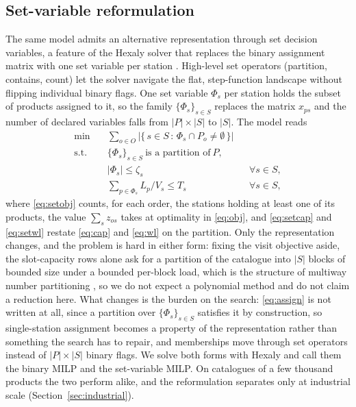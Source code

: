 \documentclass[]{interact}
\begin{document}
\subsection{Set-variable reformulation}\label{sec:setvar}
The same model admits an alternative representation through set decision variables, a feature of the Hexaly solver that replaces the binary assignment matrix with one set variable per station \citep{blaisemodeling}. High-level set operators (partition, contains, count) let the solver navigate the flat, step-function landscape without flipping individual binary flags. One set variable $\Phi_s$ per station holds the subset of products assigned to it, so the family $\{\Phi_s\}_{s \in S}$ replaces the matrix $x_{ps}$ and the number of declared variables falls from $|P|\times|S|$ to $|S|$. The model reads
\begin{align}
\min \quad & \sum_{o \in O} \bigl|\{\, s \in S \,:\, \Phi_s \cap P_o \neq \emptyset \,\}\bigr| \label{eq:setobj}\\
\text{s.t.} \quad & \{\Phi_s\}_{s \in S}\ \text{is a partition of}\ P, \label{eq:setpart}\\
& |\Phi_s| \le \zeta_s && \forall s \in S, \label{eq:setcap}\\
& \sum_{p \in \Phi_s} L_p / V_s \le T_s && \forall s \in S, \label{eq:setwl}
\end{align}
where \eqref{eq:setobj} counts, for each order, the stations holding at least one of its products, the value $\sum_{s} z_{os}$ takes at optimality in \eqref{eq:obj}, and \eqref{eq:setcap} and \eqref{eq:setwl} restate \eqref{eq:cap} and \eqref{eq:wl} on the partition. Only the representation changes, and the problem is hard in either form: fixing the visit objective aside, the slot-capacity rows alone ask for a partition of the catalogue into $|S|$ blocks of bounded size under a bounded per-block load, which is the structure of multiway number partitioning \citep{garey1979computers}, so we do not expect a polynomial method and do not claim a reduction here. What changes is the burden on the search: \eqref{eq:assign} is not written at all, since a partition over $\{\Phi_s\}_{s \in S}$ satisfies it by construction, so single-station assignment becomes a property of the representation rather than something the search has to repair, and memberships move through set operators instead of $|P|\times|S|$ binary flags. We solve both forms with Hexaly and call them the binary MILP and the set-variable MILP. On catalogues of a few thousand products the two perform alike, and the reformulation separates only at industrial scale (Section~\ref{sec:industrial}).
\end{document}
